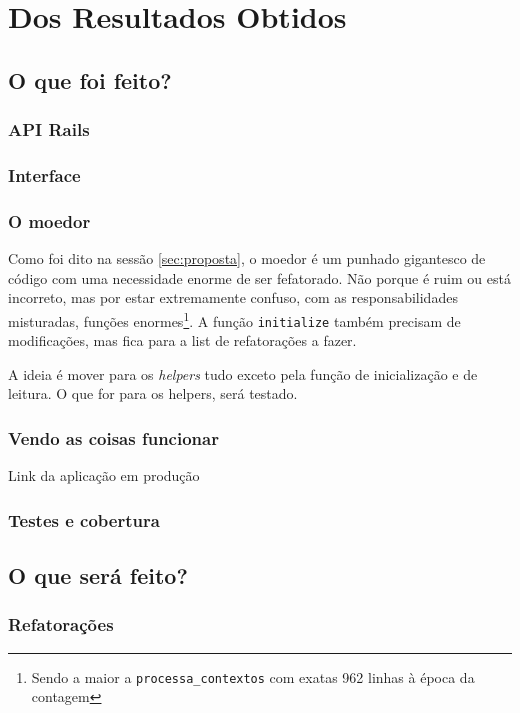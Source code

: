 \chapter{Dos Resultados Obtidos}
\label{cap:results}
\minitoc


\section{O que foi feito?}
\label{sec:to-be-done}

\subsection{API Rails}\label{subsec:api-rails}

\subsection{Interface}\label{subsec:interface}

\subsection{O moedor}\label{subsec:o-moedor}

Como foi dito na sessão \ref{sec:proposta}, o moedor é um punhado gigantesco de código com uma necessidade enorme de
ser fefatorado. Não porque é ruim ou está incorreto, mas por estar extremamente confuso, com as responsabilidades
misturadas, funções enormes\footnote{Sendo a maior a \texttt{processa\_contextos} com exatas 962 linhas à época da
contagem}. A função \texttt{initialize} também precisam de modificações, mas fica para a list de refatorações a fazer.

A ideia é mover para os \emph{helpers} tudo exceto pela função de inicialização e de leitura. O que for para os helpers,
será testado.

\subsection{Vendo as coisas funcionar}
\label{subsec:ver-funcionando}

Link da aplicação em produção

\subsection{Testes e cobertura}
\label{subsec:testes-cobertura}

\section{O que será feito?}
\label{sec:what-will-be-done}


\subsection{Refatorações}\label{subsec:refatoracoes}

